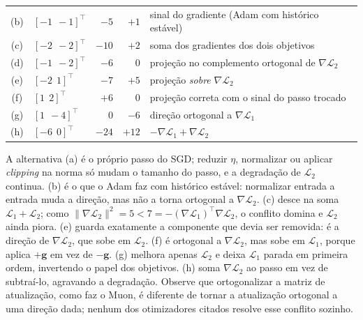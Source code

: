 \documentclass{dlproblemset}
\begin{document}
\begin{enumerate}[1)]
\begin{center}
\begin{tabular}{clrrl}
    (b) & $[-1\ \ -1]^{\top}$ & $-5$ & $+1$ & sinal do gradiente (Adam com histórico estável) \\
    (c) & $[-2\ \ -2]^{\top}$ & $-10$ & $+2$ & soma dos gradientes dos dois objetivos \\
    (d) & $[-1\ \ -2]^{\top}$ & $-6$ & $0$ & projeção no complemento ortogonal de $\nabla\mathcal{L}_2$ \\
    (e) & $[-2\ \ 1]^{\top}$ & $-7$ & $+5$ & projeção \emph{sobre} $\nabla\mathcal{L}_2$ \\
    (f) & $[1\ \ 2]^{\top}$ & $+6$ & $0$ & projeção correta com o sinal do passo trocado \\
    (g) & $[1\ \ -4]^{\top}$ & $0$ & $-6$ & direção ortogonal a $\nabla\mathcal{L}_1$ \\
    (h) & $[-6\ \ 0]^{\top}$ & $-24$ & $+12$ & $-\nabla\mathcal{L}_1 + \nabla\mathcal{L}_2$ \\
    \end{tabular}
    \end{center}
    A alternativa (a) é o próprio passo do SGD; reduzir $\eta$, normalizar ou aplicar \textit{clipping} na norma só mudam o tamanho do passo, e a degradação de $\mathcal{L}_2$ continua. (b) é o que o Adam faz com histórico estável: normalizar entrada a entrada muda a direção, mas não a torna ortogonal a $\nabla\mathcal{L}_2$. (c) desce na soma $\mathcal{L}_1 + \mathcal{L}_2$; como $\|\nabla\mathcal{L}_2\|^2 = 5 < 7 = -(\nabla\mathcal{L}_1)^{\top}\nabla\mathcal{L}_2$, o conflito domina e $\mathcal{L}_2$ ainda piora. (e) guarda exatamente a componente que devia ser removida: é a direção de $\nabla\mathcal{L}_2$, que sobe em $\mathcal{L}_2$. (f) é ortogonal a $\nabla\mathcal{L}_2$, mas sobe em $\mathcal{L}_1$, porque aplica $+\mathbf{g}$ em vez de $-\mathbf{g}$. (g) melhora apenas $\mathcal{L}_2$ e deixa $\mathcal{L}_1$ parada em primeira ordem, invertendo o papel dos objetivos. (h) soma $\nabla\mathcal{L}_2$ ao passo em vez de subtraí-lo, agravando a degradação. Observe que ortogonalizar a matriz de atualização, como faz o Muon, é diferente de tornar a atualização ortogonal a uma direção dada; nenhum dos otimizadores citados resolve esse conflito sozinho.


\end{enumerate}
\end{document}
